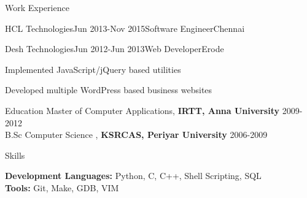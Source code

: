\documentclass{resume} %
\begin{document}
\begin{rSection}{ Work Experience }
\begin{rSubsection}{HCL Technologies}{Jun 2013-Nov 2015}{Software Engineer}{Chennai}
\end{rSubsection} 

\vspace{-4pt}


\begin{rSubsection}{Desh Technologies}{Jun 2012-Jun 2013}{Web Developer}{Erode}    

\vspace{-3pt}

\item Implemented JavaScript/jQuery based utilities 
\item Developed multiple WordPress based business websites

\end{rSubsection} 

 
\end{rSection}


\begin{rSection}{Education}
{ Master of Computer Applications, \textbf{IRTT, Anna University}} \hfill {2009-2012}
\\
{ B.Sc Computer Science , \textbf{KSRCAS, Periyar University}} \hfill {2006-2009}

  


\end{rSection} 


\begin{rSection}{Skills} \itemsep -3pt  

{\textbf{Development Languages:} Python, C, C++, Shell Scripting, SQL }  \\
{\textbf{Tools:} Git, Make, GDB, VIM} 
\end{rSection}  
 




\end{document}
